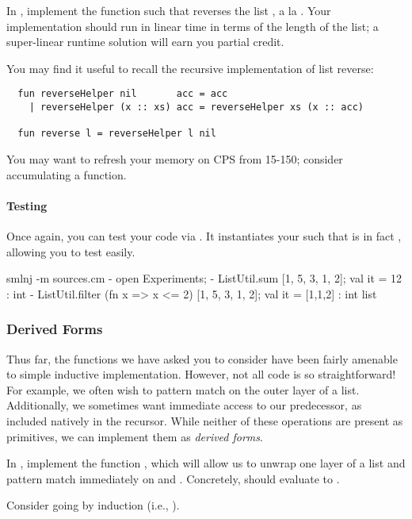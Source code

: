 \documentclass[11pt]{article}
\begin{document}
\begin{task}{10}
  In , implement the function  such that  reverses the list , a la .
  Your implementation should run in linear time in terms of the length of the list; a super-linear runtime solution will earn you partial credit.
\end{task}
\begin{hint}
  You may find it useful to recall the recursive implementation of list reverse:
\begin{lstlisting}
  fun reverseHelper nil       acc = acc
    | reverseHelper (x :: xs) acc = reverseHelper xs (x :: acc)

  fun reverse l = reverseHelper l nil
\end{lstlisting}

  You may want to refresh your memory on CPS from 15-150; consider accumulating a function.
\end{hint}

\paragraph{Testing}
Once again, you can test your code via .
It instantiates your  such that  is in fact , allowing you to test easily.
\begin{codeblock}
  smlnj -m sources.cm
  - open Experiments;
  - ListUtil.sum [1, 5, 3, 1, 2];
  val it = 12 : int
  - ListUtil.filter (fn x => x <= 2) [1, 5, 3, 1, 2];
  val it = [1,1,2] : int list
\end{codeblock}

\subsubsection{Derived Forms}

Thus far, the functions we have asked you to consider have been fairly amenable to simple inductive implementation.
However, not all code is so straightforward!
For example, we often wish to pattern match on the outer layer of a list.
Additionally, we sometimes want immediate access to our predecessor, as included natively in the \LangT{} recursor.
While neither of these operations are present as primitives, we can implement them as \emph{derived forms}.

\begin{task}{10}
  In , implement the function , which will allow us to unwrap one layer of a list and pattern match immediately on  and .
  Concretely,  should evaluate to .
\end{task}
\begin{hint}
  Consider going by induction (i.e., ).
\end{hint}
\end{document}
